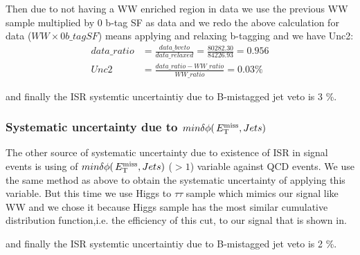 Then due to not having a WW enriched region in data we use the previous WW sample multiplied by 0 b-tag SF as data and we redo the above calculation for data ($WW \times 0b\_tag SF$) means applying and relaxing b-tagging and we have Unc2:
\begin{align}
data\_ratio &= \frac{data\_bveto}{data\_relaxed} = \frac{80282.30}{84226.93} = 0.956 \\ \nonumber
Unc2 &= \frac{data\_ratio - WW\_ratio}{WW\_ratio} = 0.03 \%
\end{align}

and finally the ISR systemtic uncertaintiy due to B-mistagged jet veto is 3 \%.

\subsubsection{Systematic uncertainty due to $min\delta \phi (\,{E_{\rm T}^{\rm miss}} , Jets)$}

The other source of systematic uncertainty due to existence of ISR in signal events is using of $min\delta \phi (\,{E_{\rm T}^{\rm miss}} , Jets)$ ($ > 1$) variable against QCD events. We use the same method as above to obtain the systematic uncertainty of applying this variable. But this time we use Higgs to $\tau \tau$ sample which mimics our signal like WW and we chose it because Higgs sample has the most similar cumulative distribution function,i.e. the efficiency of this cut, to our signal that is shown in. %




and finally the ISR systemtic uncertaintiy due to B-mistagged jet veto is 2 \%.


